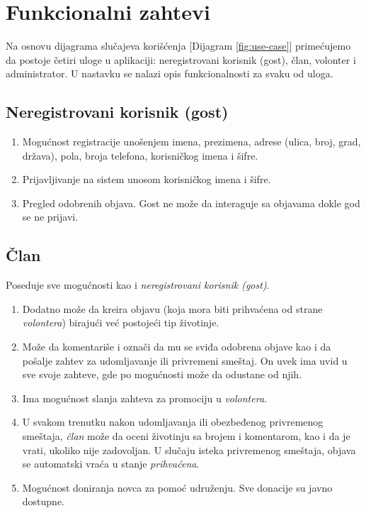\section{Funkcionalni zahtevi}
\par Na osnovu dijagrama slučajeva korišćenja [Dijagram \ref{fig:use-case}] primećujemo da postoje četiri uloge u aplikaciji: neregistrovani korisnik (gost), član, volonter i administrator. 
U nastavku se nalazi opis funkcionalnosti za svaku od uloga.
\subsection{Neregistrovani korisnik (gost)} 
    \begin{enumerate}
        \item Mogućnost registracije unošenjem imena, prezimena, adrese (ulica, broj, grad, država), pola, broja telefona, korisničkog imena i šifre.
        \item Prijavljivanje na sistem unosom korisničkog imena i šifre.
        \item Pregled odobrenih objava. Gost ne može da interaguje sa objavama dokle god se ne prijavi.
    \end{enumerate}
\subsection{Član}
    \par Poseduje sve mogućnosti kao i \textit{neregistrovani korisnik (gost)}. 
    \begin{enumerate}
        \item Dodatno može da kreira objavu (koja mora biti prihvaćena od strane \textit{volontera}) birajući već postojeći tip životinje. 
        \item Može da komentariše i označi da mu se sviđa odobrena objave kao i da pošalje zahtev za udomljavanje ili privremeni smeštaj. 
        On uvek ima uvid u sve svoje zahteve, gde po mogućnosti može da odustane od njih. 
        \item Ima mogućnost slanja zahteva za promociju u \textit{volontera}.
        \item U svakom trenutku nakon udomljavanja ili obezbeđenog privremenog sme\-štaja, \textit{član} može da oceni životinju sa brojem i komentarom, kao i da je vrati, ukoliko nije 
        zadovoljan. U slučaju isteka privremenog smeštaja, objava se automatski vraća u stanje \textit{prihvaćena}.
        \item Mogućnost doniranja novca za pomoć udruženju. Sve donacije su javno dostupne.
    \end{enumerate}
